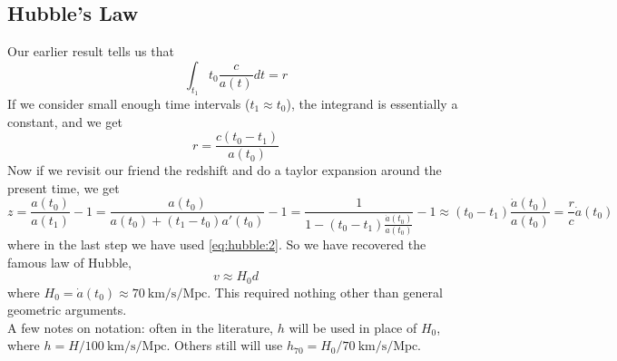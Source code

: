 \documentclass[10pt]{article}
\numberwithin{equation}{section}
\newcommand{\n}{\noindent}
\begin{document}
	\subsection{Hubble's Law} %
	\label{sub:hubble_s_law}
	Our earlier result tells us that
	\begin{equation}
		\label{eq:hubble:1} \int_{t_1}{t_0} \frac{c}{a(t)}dt = r
	\end{equation}
	If we consider small enough time intervals ($t_1\approx t_0$), the integrand is essentially a constant, and we get
	\begin{equation}
		\label{eq:hubble:2} r = \frac{c(t_0-t_1)}{a(t_0)}
	\end{equation}
	Now if we revisit our friend the redshift and do a taylor expansion around the present time, we get
	\begin{equation}
		\label{eq:hubble:3} z = \frac{a(t_0)}{a(t_1)}-1 = \frac{a(t_0)}{a(t_0)+(t_1-t_0)a'(t_0)}-1 = \frac{1}{1-(t_0-t_1)\frac{\dot{a}(t_0)}{a(t_0)}}-1\approx (t_0-t_1)\frac{\dot{a}(t_0)}{a(t_0)} = \frac{r}{c}\dot{a}(t_0)
	\end{equation}
	where in the last step we have used \eqref{eq:hubble:2}. So we have recovered the famous law of Hubble,
	\begin{equation}
		\label{eq:hubble:4} v\approx H_0 d
	\end{equation}
	where $H_0=\dot{a}(t_0)\approx 70\ \mathrm{km/s/Mpc}$. This required nothing other than general geometric arguments.\\
	
	\n A few notes on notation: often in the literature, $h$ will be used in place of $H_0$, where $h= H/100\ \mathrm{km/s/Mpc}$. Others still will use $h_{70} = H_0 / 70\ \mathrm{km/s/Mpc}$.
\end{document}
